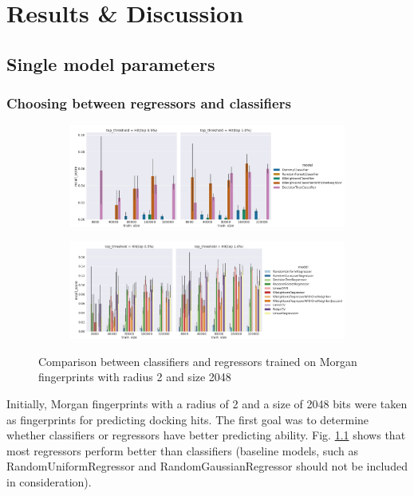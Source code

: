 \chapter{Results \& Discussion}
\section{Single model parameters}
\subsection{Choosing between regressors and classifiers}

\begin{figure}[h]
\centering
\begin{subfigure}{\textwidth}
\includegraphics[scale=0.25]{Images/MorganRadius2Size2048Classifier1.jpg} 
\end{subfigure}

\begin{subfigure}{\textwidth}
\includegraphics[scale=0.25]{Images/MorganRadius2Size2048Regressor1.jpg} 
\end{subfigure}
\caption{Comparison between classifiers and regressors trained on Morgan fingerprints with radius 2 and size 2048 }
\label{RegressorsVSClassifiers}
\end{figure}

Initially, Morgan fingerprints with a radius of 2 and a size of 2048 bits were taken as fingerprints for predicting docking hits.
The first goal was to determine whether classifiers or regressors have better predicting ability.
Fig. \ref{RegressorsVSClassifiers} shows that most regressors perform better than classifiers (baseline models, such as RandomUniformRegressor and RandomGaussianRegressor should not be included in consideration).

